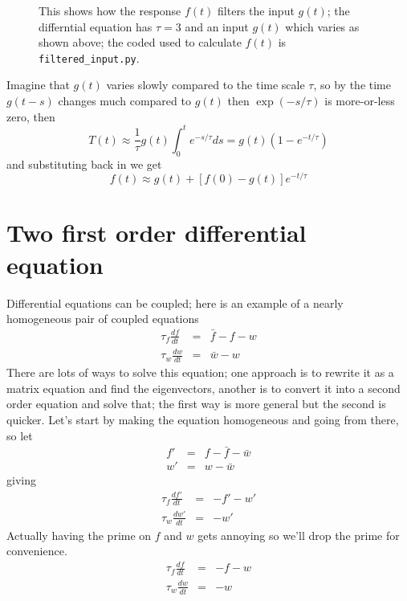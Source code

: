 \documentclass{article}
\begin{document}
\begin{figure}[tb]
\begin{center}

\end{center}
\caption{This shows how the response $f(t)$ filters the input $g(t)$;
  the differntial equation has $\tau=3$ and an input $g(t)$ which
  varies as shown above; the coded used to calculate $f(t)$ is
  \texttt{filtered\_input.py}. \label{filtering}}
\end{figure}

Imagine that $g(t)$ varies slowly compared to the time scale $\tau$, so by the time $g(t-s)$ changes much compared to $g(t)$ then $\exp(-s/\tau)$ is more-or-less zero, then
\begin{equation}
T(t)\approx\frac{1}{\tau}g(t)\int_0^t e^{-s/\tau}ds=g(t)\left(1-e^{-t/\tau}\right)
\end{equation}
and substituting back in we get
\begin{equation}
f(t)\approx g(t)+[f(0)-g(t)]e^{-t/\tau}
\end{equation}

\section*{Two first order differential equation}

Differential equations can be coupled; here is an example of a nearly homogeneous pair of coupled equations
\begin{eqnarray}
\tau_f \frac{df}{dt}&=&\bar{f}-f-w\\
\tau_w \frac{dw}{dt}&=&\bar{w}-w
\end{eqnarray}
There are lots of ways to solve this equation; one approach is to
rewrite it as a matrix equation and find the eigenvectors, another is
to convert it into a second order equation and solve that; the first
way is more general but the second is quicker. Let's start by making
the equation homogeneous and going from there, so let
\begin{eqnarray}
f'&=&f-\bar{f}-\bar{w}\\
w'&=&w-\bar{w}
\end{eqnarray}
giving
\begin{eqnarray}
\tau_f \frac{df'}{dt}&=&-f'-w'\\
\tau_w \frac{dw'}{dt}&=&-w'
\end{eqnarray}
Actually having the prime on $f$ and $w$ gets annoying so we'll drop the prime for convenience.
\begin{eqnarray}
\tau_f \frac{df}{dt}&=&-f-w\\
\tau_w \frac{dw}{dt}&=&-w
\end{eqnarray}
\end{document}
